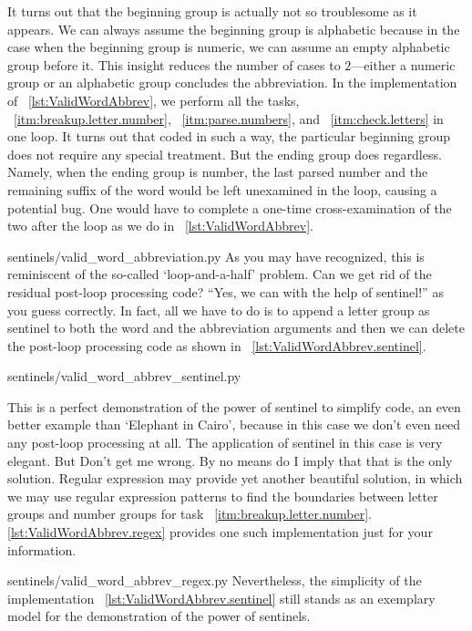 \documentclass[oneside,11pt]{book}
\makeatletter
\let\LaTeXAtSign=\@
\let\@=\relax
\let\@=\LaTeXAtSign
\theoremstyle{definition}
\theoremstyle{remark}
\makeatother
\begin{document}
It turns out that the beginning group is actually not so troublesome as it appears.
We can always assume the beginning group is alphabetic because
in the case when the beginning group is numeric, we can assume an empty alphabetic group before it.
This insight reduces the number of cases to $2$---either a numeric group or an
alphabetic group concludes the abbreviation.
In the implementation of ~\autoref{lst:ValidWordAbbrev}, we perform all the tasks,
~\autoref{itm:breakup.letter.number}, ~\autoref{itm:parse.numbers},
and ~\autoref{itm:check.letters} in one loop.
It turns out that coded in such a way, the particular beginning group does not require any special
treatment.
But the ending group does regardless.
Namely, when the ending group is number, the last parsed number and the remaining suffix of the
word would be left unexamined in the loop, causing a potential bug.
One would have to complete a one-time cross-examination of the two after the loop as we do in
~\autoref{lst:ValidWordAbbrev}.

{sentinels/valid_word_abbreviation.py}
As you may have recognized, this is reminiscent of the so-called `loop-and-a-half' problem.
Can we get rid of the residual post-loop processing code?
``Yes, we can with the help of sentinel!'' as you guess correctly.
In fact, all we have to do is to
append a letter group as sentinel to both the word and the abbreviation arguments
and then we can delete the post-loop processing code as shown in
~\autoref{lst:ValidWordAbbrev.sentinel}.

{sentinels/valid_word_abbrev_sentinel.py}

This is a perfect demonstration of the power of sentinel to simplify code,
an even better example
than `Elephant in Cairo', because in this case we don't even need any post-loop processing at all.
The application of sentinel in this case is very elegant.
But Don't get me wrong.
By no means do I imply that that is the only solution.
Regular expression may provide yet another beautiful solution, in which we may use regular
expression patterns to find the boundaries between letter groups and number groups for task
~\autoref{itm:breakup.letter.number}.
\@\autoref{lst:ValidWordAbbrev.regex} provides one such implementation just for your information.

{sentinels/valid_word_abbrev_regex.py}
Nevertheless, the simplicity of the implementation ~\autoref{lst:ValidWordAbbrev.sentinel} still
stands as an exemplary model for the demonstration of the power of sentinels.
\end{document}
